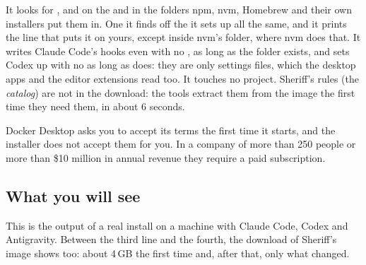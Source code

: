 \documentclass[11pt,a4paper]{article}
\begin{document}
It looks for ,  and  on the 
and in the folders npm, nvm, Homebrew and their own installers put them in.
One it finds off the  it sets up all the same, and it prints the
line that puts it on yours, except inside nvm's folder, where nvm does that. It writes Claude Code's hooks even with no
, as long as the folder  exists, and sets Codex up
with no  as long as  does: they are only settings
files, which the desktop apps and the editor extensions read too. It touches no
project. Sheriff's rules (the \emph{catalog}) are not in the
download: the tools extract them from the image the first time they need them,
in about 6 seconds.

\begin{warning}
Docker Desktop asks you to accept its terms the first time it starts, and the
installer does not accept them for you. In a company of more than 250 people or
more than \$10 million in annual revenue they require a paid subscription.
\end{warning}

\subsection{What you will see}

This is the output of a real install on a machine with Claude Code, Codex and
Antigravity.
Between the third line and the fourth, the download of Sheriff's image shows
too: about 4\,GB the first time and, after that, only what changed.
\end{document}
